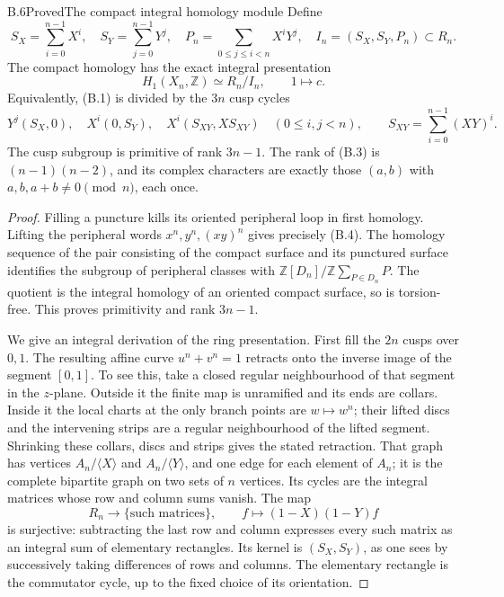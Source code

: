 \begin{statement}{B.6}{Proved}{The compact integral homology module}
Define
\[
 S_X=\sum_{i=0}^{n-1}X^i,\quad S_Y=\sum_{j=0}^{n-1}Y^j,\quad
 P_n=\sum_{0\le j\le i<n}X^iY^j,\quad
 I_n=(S_X,S_Y,P_n)\subset R_n.
\]
The compact homology has the exact integral presentation
\[
 H_1(X_n,\mathbb Z)\simeq R_n/I_n,\qquad 1\longmapsto c.        \tag{B.3}
\]
Equivalently, (B.1) is divided by the \(3n\) cusp cycles
\[
 Y^j(S_X,0),\quad X^i(0,S_Y),\quad
 X^i(S_{XY},X S_{XY})\quad(0\le i,j<n),
 \qquad S_{XY}=\sum_{i=0}^{n-1}(XY)^i.                        \tag{B.4}
\]
The cusp subgroup is primitive of rank \(3n-1\).
The rank of (B.3) is \((n-1)(n-2)\), and its complex characters
are exactly those \((a,b)\) with \(a,b,a+b\ne0\pmod n\), each once.
\end{statement}
\begin{proof}
Filling a puncture kills its oriented peripheral loop in first homology.
Lifting the peripheral words \(x^n,y^n,(xy)^n\) gives precisely (B.4).
The homology sequence of the pair consisting of the compact surface and
its punctured surface identifies the subgroup of peripheral classes
with \(\mathbb Z[D_n]/\mathbb Z\sum_{P\in D_n}P\).
The quotient is the integral homology of an oriented compact surface,
so is torsion-free. This proves primitivity and rank \(3n-1\).

We give an integral derivation of the ring presentation. First fill
the \(2n\) cusps over \(0,1\). The resulting affine curve
\(u^n+v^n=1\) retracts onto the inverse image of the segment \([0,1]\).
To see this, take a closed regular neighbourhood of that segment
in the \(z\)-plane. Outside it the finite map is unramified and its
ends are collars. Inside it the local charts at the only branch
points are \(w\mapsto w^n\); their lifted discs and the intervening
strips are a regular neighbourhood of the lifted segment.
Shrinking these collars, discs and strips gives the stated retraction.
That graph has vertices \(A_n/\langle X\rangle\) and
\(A_n/\langle Y\rangle\), and one edge for each element of \(A_n\);
it is the complete bipartite graph on two sets of \(n\) vertices.
Its cycles are the integral matrices whose row and column sums vanish.
The map
\[
 R_n\longrightarrow\{\text{such matrices}\},\qquad
 f\longmapsto(1-X)(1-Y)f
\]
is surjective: subtracting the last row and column expresses every such
matrix as an integral sum of elementary rectangles. Its kernel is
\((S_X,S_Y)\), as one sees by successively taking differences of rows
and columns. The elementary rectangle is the commutator cycle, up to
the fixed choice of its orientation.


\end{proof}
